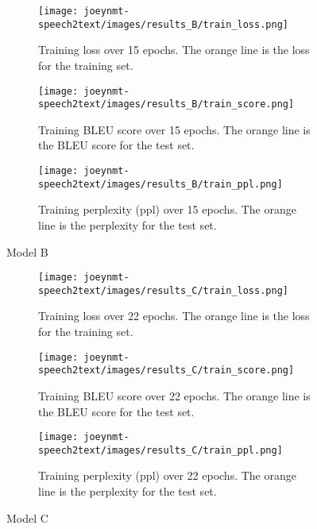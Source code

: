 \documentclass[11pt,a4paper]{article}
\begin{document}
\begin{figure*}[ht]
    \begin{subfigure}[b]{0.32\textwidth}
        \centering
        \texttt{[image: joeynmt-speech2text/images/results\_B/train\_loss.png]}
        \caption{Training loss over 15 epochs. The orange line is the loss for the training set.}
        \label{fig:train_loss_b}
    \end{subfigure}
    \hfill
    \begin{subfigure}[b]{0.32\textwidth}
        \centering
        \texttt{[image: joeynmt-speech2text/images/results\_B/train\_score.png]}
        \caption{Training BLEU score over 15 epochs. The orange line is the BLEU score for the test set.}
        \label{fig:train_score_b}
    \end{subfigure}
    \hfill
    \begin{subfigure}[b]{0.32\textwidth}
        \centering
        \texttt{[image: joeynmt-speech2text/images/results\_B/train\_ppl.png]}
        \caption{Training perplexity (ppl) over 15 epochs. The orange line is the perplexity for the test set.}
        \label{fig:train_ppl_b}
    \end{subfigure}
    \caption{Model B}
    \label{fig:model_b_loss_ppl_score}
\end{figure*}

\begin{figure*}[ht]
    \begin{subfigure}[b]{0.32\textwidth}
        \centering
        \texttt{[image: joeynmt-speech2text/images/results\_C/train\_loss.png]}
        \caption{Training loss over 22 epochs. The orange line is the loss for the training set.}
        \label{fig:train_loss_c}
    \end{subfigure}
    \hfill
    \begin{subfigure}[b]{0.32\textwidth}
        \centering
        \texttt{[image: joeynmt-speech2text/images/results\_C/train\_score.png]}
        \caption{Training BLEU score over 22 epochs. The orange line is the BLEU score for the test set.}
        \label{fig:train_score_c}
    \end{subfigure}
    \hfill
    \begin{subfigure}[b]{0.32\textwidth}
        \centering
        \texttt{[image: joeynmt-speech2text/images/results\_C/train\_ppl.png]}
        \caption{Training perplexity (ppl) over 22 epochs. The orange line is the perplexity for the test set.}
        \label{fig:train_ppl_c}
    \end{subfigure}
    \caption{Model C}
    \label{fig:model_c_loss_ppl_score}
\end{figure*}
\end{document}
